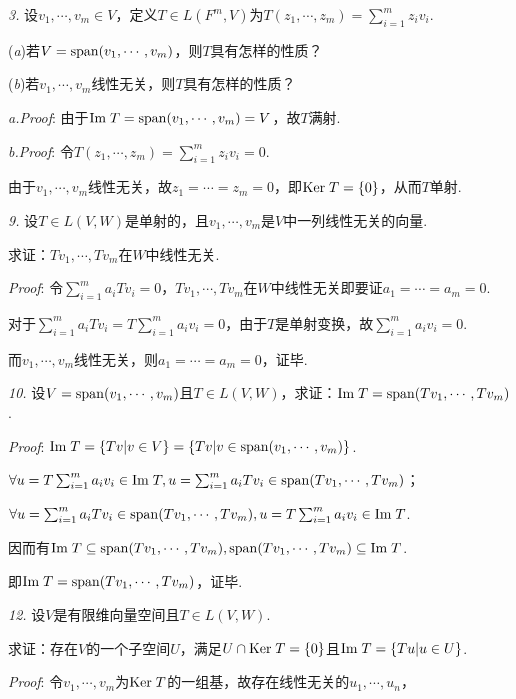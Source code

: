 \textit{3.}
设$v_1,\cdots,v_m \in V$，定义$T \in L(F^m,V)$为$T(z_1,\cdots,z_m)=\sum_{i=1}^m z_iv_i$.

(\textit{a})若$V=\mathrm{span} (v_1,\cdots,v_m)$，则$T$具有怎样的性质？

(\textit{b})若$v_1,\cdots,v_m$线性无关，则$T$具有怎样的性质？

\textit{a.Proof}:
由于$\mathrm{Im \;} T=\mathrm{span} (v_1,\cdots,v_m)=V$，故$T$满射.

\textit{b.Proof}:
令$T(z_1,\cdots,z_m)=\sum_{i=1}^m z_iv_i=0$.

由于$v_1,\cdots,v_m$线性无关，故$z_1=\cdots=z_m=0$，即$\mathrm{Ker \;} T=\{0\}$，从而$T$单射.

\hspace*{\fill}

\textit{9.}
设$T\in L(V,W)$是单射的，且$v_1,\cdots,v_m$是$V$中一列线性无关的向量.

求证：$Tv_1,\cdots,Tv_m$在$W$中线性无关.

\textit{Proof}:
令$\sum_{i=1}^m a_iTv_i=0$，$Tv_1,\cdots,Tv_m$在$W$中线性无关即要证$a_1=\cdots=a_m=0$.

对于$\sum_{i=1}^m a_iTv_i=T\sum_{i=1}^m a_iv_i=0$，由于$T$是单射变换，故$\sum_{i=1}^m a_iv_i=0$.

而$v_1,\cdots,v_m$线性无关，则$a_1=\cdots=a_m=0$，证毕.

\hspace*{\fill}

\textit{10.}
设$V=\mathrm{span} (v_1,\cdots,v_m)$且$T\in L(V,W)$，求证：$\mathrm{Im \;} T=\mathrm{span} (Tv_1,\cdots,Tv_m)$.

\textit{Proof}:
$\mathrm{Im \;} T=\{Tv|v\in V\}=\{Tv|v\in \mathrm{span}(v_1,\cdots,v_m)\}$.

$\forall u=T\sum_{i=1}^m a_iv_i \in \mathrm{Im \;} T,u=\sum_{i=1}^m a_iTv_i \in \mathrm{span}(Tv_1,\cdots,Tv_m)$；

$\forall u=\sum_{i=1}^m a_iTv_i \in \mathrm{span}(Tv_1,\cdots,Tv_m),u=T\sum_{i=1}^m a_iv_i \in \mathrm{Im \;} T$.

因而有$\mathrm{Im \;} T \subseteq \mathrm{span}(Tv_1,\cdots,Tv_m),\mathrm{span}(Tv_1,\cdots,Tv_m) \subseteq \mathrm{Im \;} T$.

即$\mathrm{Im \;} T=\mathrm{span} (Tv_1,\cdots,Tv_m)$，证毕.

\hspace*{\fill}

\textit{12.}
设$V$是有限维向量空间且$T\in L(V,W)$.

求证：存在$V$的一个子空间$U$，满足$U \cap \mathrm{Ker \;} T=\{0\}$且$\mathrm{Im \;} T=\{Tu|u\in U\}$.

\textit{Proof}:
令$v_1,\cdots,v_m$为$\mathrm{Ker \;} T$的一组基，故存在线性无关的$u_1,\cdots,u_n$，

